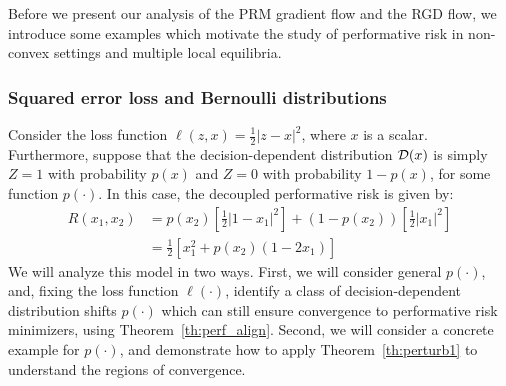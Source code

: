 
Before we present our analysis of the PRM gradient flow and the RGD flow, we introduce some examples which motivate the study of performative risk in non-convex settings and multiple local equilibria. 

\subsubsection{Squared error loss and Bernoulli distributions}
\label{sec:simple_ex}

Consider the loss function $\ell(z,x) = \frac{1}{2} |z-x|^2$, where $x$ is a scalar. Furthermore, suppose that the decision-dependent distribution $\mathcal{D}(x)$ is simply $Z = 1$ with probability $p(x)$ and $Z = 0$ with probability $1 - p(x)$, for some function $p(\cdot)$. 
In this case, the decoupled performative risk is given by:
\begin{equation}
\label{eq:simple_dpr}
\begin{aligned}
R(x_1,x_2) &= p(x_2) \left[ \frac{1}{2} |1-x_1|^2 \right] + (1 - p(x_2)) \left[ \frac{1}{2} |x_1|^2 \right]\\
&= \frac{1}{2} [x_1^2 + p(x_2) (1 - 2x_1)]
\end{aligned}
\end{equation}
We will analyze this model in two ways. First, we will consider general $p(\cdot)$, and, fixing the loss function $\ell(\cdot)$, identify a class of decision-dependent distribution shifts $p(\cdot)$ which can still ensure convergence to performative risk minimizers, using Theorem~\ref{th:perf_align}. Second, we will consider a concrete example for $p(\cdot)$, and demonstrate how to apply Theorem~\ref{th:perturb1} to understand the regions of convergence.


